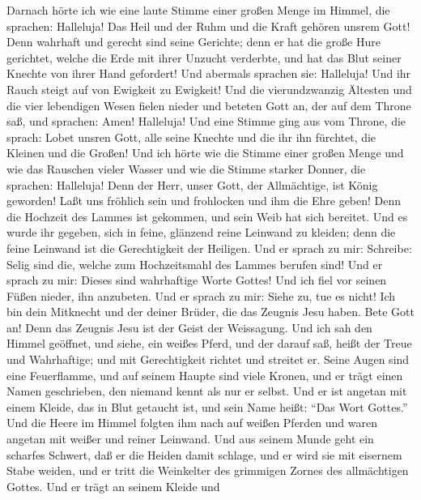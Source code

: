  Darnach hörte ich wie eine laute Stimme einer großen
Menge im Himmel, die sprachen: Halleluja! Das Heil und der Ruhm und die
Kraft gehören unsrem Gott!  Denn wahrhaft und gerecht sind
seine Gerichte; denn er hat die große Hure gerichtet, welche die Erde
mit ihrer Unzucht verderbte, und hat das Blut seiner Knechte von ihrer
Hand gefordert!  Und abermals sprachen sie: Halleluja! Und
ihr Rauch steigt auf von Ewigkeit zu Ewigkeit!  Und die
vierundzwanzig Ältesten und die vier lebendigen Wesen fielen nieder und
beteten Gott an, der auf dem Throne saß, und sprachen: Amen! Halleluja!
 Und eine Stimme ging aus vom Throne, die sprach: Lobet
unsren Gott, alle seine Knechte und die ihr ihn fürchtet, die Kleinen
und die Großen!  Und ich hörte wie die Stimme einer großen
Menge und wie das Rauschen vieler Wasser und wie die Stimme starker
Donner, die sprachen: Halleluja! Denn der Herr, unser Gott, der
Allmächtige, ist König geworden!  Laßt uns fröhlich sein
und frohlocken und ihm die Ehre geben! Denn die Hochzeit des Lammes ist
gekommen, und sein Weib hat sich bereitet.  Und es wurde
ihr gegeben, sich in feine, glänzend reine Leinwand zu kleiden; denn die
feine Leinwand ist die Gerechtigkeit der Heiligen.  Und er
sprach zu mir: Schreibe: Selig sind die, welche zum Hochzeitsmahl des
Lammes berufen sind! Und er sprach zu mir: Dieses sind wahrhaftige Worte
Gottes!  Und ich fiel vor seinen Füßen nieder, ihn
anzubeten. Und er sprach zu mir: Siehe zu, tue es nicht! Ich bin dein
Mitknecht und der deiner Brüder, die das Zeugnis Jesu haben. Bete Gott
an! Denn das Zeugnis Jesu ist der Geist der Weissagung. 
Und ich sah den Himmel geöffnet, und siehe, ein weißes Pferd, und der
darauf saß, heißt der Treue und Wahrhaftige; und mit Gerechtigkeit
richtet und streitet er.  Seine Augen sind eine
Feuerflamme, und auf seinem Haupte sind viele Kronen, und er trägt einen
Namen geschrieben, den niemand kennt als nur er selbst. 
Und er ist angetan mit einem Kleide, das in Blut getaucht ist, und sein
Name heißt: ``Das Wort Gottes.''  Und die Heere im Himmel
folgten ihm nach auf weißen Pferden und waren angetan mit weißer und
reiner Leinwand.  Und aus seinem Munde geht ein scharfes
Schwert, daß er die Heiden damit schlage, und er wird sie mit eisernem
Stabe weiden, und er tritt die Weinkelter des grimmigen Zornes des
allmächtigen Gottes.  Und er trägt an seinem Kleide und
